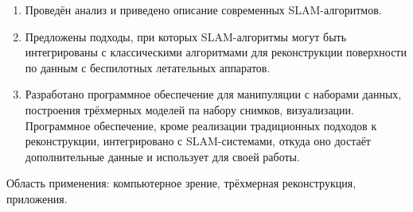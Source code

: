\begin{titlepage}
    \begin{enumerate}
        \item Проведён анализ и приведено описание современных SLAM-алгоритмов.
        \item Предложены подходы, при которых SLAM-алгоритмы могут быть интегрированы с классическими
        алгоритмами для реконструкции поверхности по данным с беспилотных летательных аппаратов.
        \item Разработано программное обеспечение для манипуляции с наборами данных,
        построения трёхмерных моделей па набору снимков, визуализации.
        Программное обеспечение, кроме реализации традиционных подходов к реконструкции,
        интегрировано с SLAM-системами, откуда оно достаёт дополнительные данные и использует для своей работы.
    \end{enumerate}

    \vspace{4mm}

    Область применения: компьютерное зрение, трёхмерная реконструкция, приложения.
\end{titlepage}

\newpage

